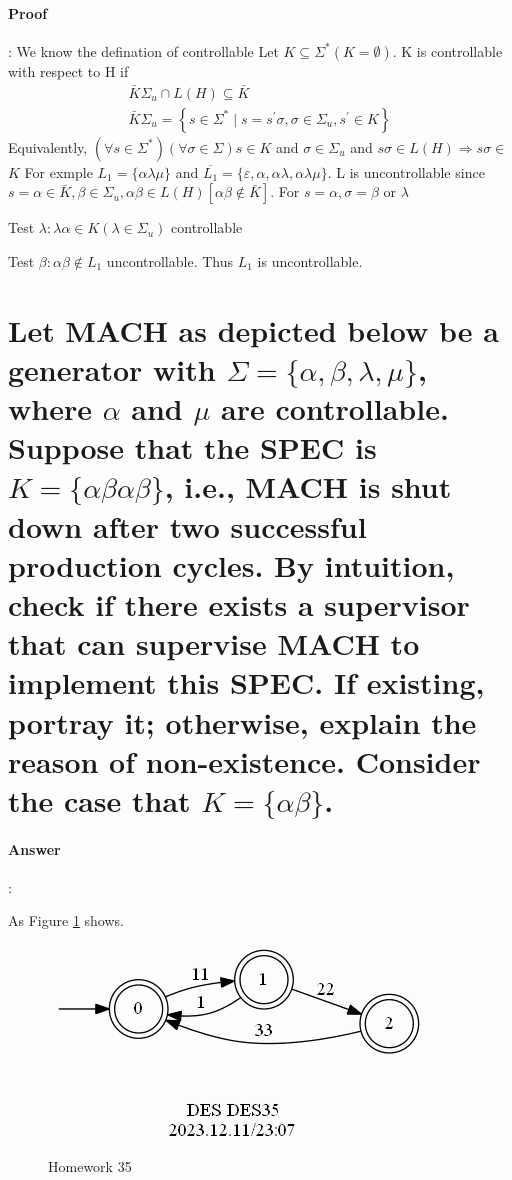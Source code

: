 \documentclass{article}
\begin{document}
\paragraph{Proof}:
We know the defination of controllable Let $K \subseteq \Sigma^*(K=\emptyset)$. K is controllable with respect to $\mathrm{H}$ if
$$
\begin{array}{r}
\bar{K} \Sigma_u \cap L(H) \subseteq \bar{K} \\
\bar{K} \Sigma_u=\left\{s \in \Sigma^* \mid s=s^{\prime} \sigma, \sigma \in \Sigma_u, s^{\prime} \in K\right\}
\end{array}
$$
Equivalently, $\left(\forall s \in \Sigma^*\right)(\forall \sigma \in \Sigma) s \in K$ and $\sigma \in \Sigma_u$ and $s \sigma \in L(H) \Rightarrow s \sigma \in$
$K$
For exmple $L_1=\{\alpha \lambda \mu\}$ and $\overline{L_1}=\{\varepsilon, \alpha, \alpha \lambda, \alpha \lambda \mu\}$. L is uncontrollable since $s=\alpha \in \bar{K}, \beta \in \Sigma_u, \alpha \beta \in L(H)[\alpha \beta \notin \bar{K}]$. For $s=\alpha, \sigma=\beta$ or $\lambda$

Test $\lambda: \lambda \alpha \in K\left(\lambda \in \Sigma_u\right)$ controllable


Test $\beta: \alpha \beta \notin L_1$ uncontrollable. Thus $L_1$ is uncontrollable.

\section{Let MACH as depicted below be a generator with $\Sigma = \{\alpha , \beta , \lambda , \mu \}$, where $\alpha$ and $\mu$ are controllable. Suppose that the SPEC is $K = \{\alpha\beta\alpha\beta\}$, i.e., MACH is shut down after two successful production cycles. By intuition, check if there exists a supervisor that can supervise MACH to implement this SPEC. If existing, portray it; otherwise, explain the reason of non-existence. Consider the case that $K = \{\alpha\beta\}$.}

\paragraph{Answer}:

As Figure \ref{fig:des35} shows.

\begin{figure}[h]
  \centering
  \includegraphics{assets/DES35.jpg}
  \caption{Homework 35}
  \label{fig:des35}
\end{figure}
\end{document}

